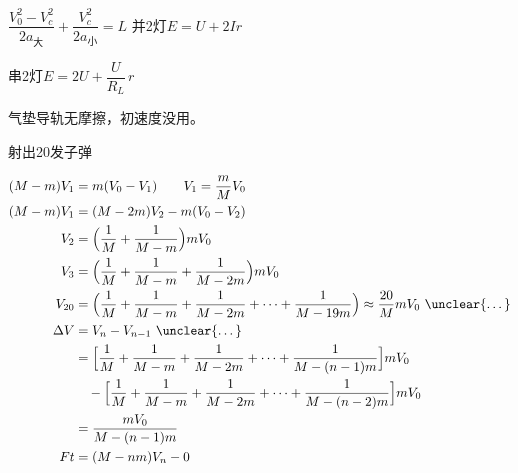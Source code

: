 
\quad $\dfrac{V_0^2-V_c^2}{2a_{\text{大}}}+\dfrac{V_c^2}{2a_{\text{小}}}=L$%
并2灯\quad $E=U+2Ir$

串2灯\quad $E=2U+\dfrac{U}{R_L}\,r$

\begin{problem}
气垫导轨无摩擦，初速度没用。%

射出20发子弹
\begin{solution}
\begin{align*}
(M-m)V_1&=m(V_0-V_1)\qquad V_1=\frac{m}{M}V_0\\
(M-m)V_1&=(M-2m)V_2-m(V_0-V_2)\\
V_2&=\Bigl(\frac{1}{M}+\frac{1}{M-m}\Bigr)mV_0\\
V_3&=\Bigl(\frac{1}{M}+\frac{1}{M-m}+\frac{1}{M-2m}\Bigr)mV_0\\
V_{20}&=\Bigl(\frac{1}{M}+\frac{1}{M-m}+\frac{1}{M-2m}+\cdots+\frac{1}{M-19m}\Bigr)\approx\frac{20}{M}mV_0\ \text{\unclear{…}}\\
\Delta V&=V_n-V_{n-1}\ \text{\unclear{…}}\\
&=\Bigl[\frac{1}{M}+\frac{1}{M-m}+\frac{1}{M-2m}+\cdots+\frac{1}{M-(n-1)m}\Bigr]mV_0\\
&\quad-\Bigl[\frac{1}{M}+\frac{1}{M-m}+\frac{1}{M-2m}+\cdots+\frac{1}{M-(n-2)m}\Bigr]mV_0\\
&=\frac{mV_0}{M-(n-1)m}\\
Ft&=(M-nm)V_n-0
\end{align*}
\end{solution}
\end{problem}

